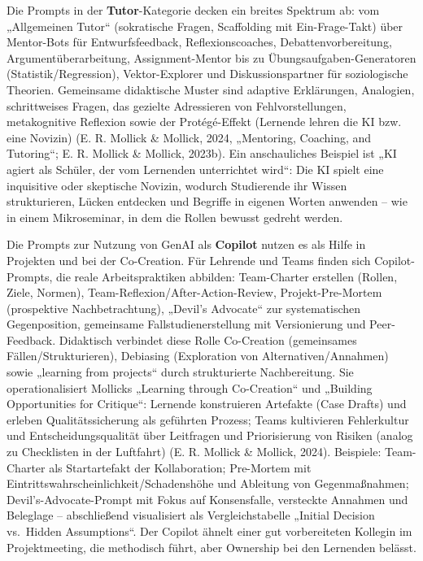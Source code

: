 \documentclass[
  ngerman,
  letterpaper,
  DIV=11]{scrreprt}
\begin{document}
Die Prompts in der \textbf{Tutor}-Kategorie decken ein breites Spektrum
ab: vom „Allgemeinen Tutor`` (sokratische Fragen, Scaffolding mit
Ein-Frage-Takt) über Mentor-Bots für Entwurfsfeedback,
Reflexionscoaches, Debattenvorbereitung, Argumentüberarbeitung,
Assignment-Mentor bis zu Übungsaufgaben-Generatoren
(Statistik/Regression), Vektor-Explorer und Diskussionspartner für
soziologische Theorien. Gemeinsame didaktische Muster sind adaptive
Erklärungen, Analogien, schrittweises Fragen, das gezielte Adressieren
von Fehlvorstellungen, metakognitive Reflexion sowie der Protégé-Effekt
(Lernende lehren die KI bzw. eine Novizin) (E. R. Mollick \& Mollick,
2024, „Mentoring, Coaching, and Tutoring``; E. R. Mollick \& Mollick,
2023b). Ein anschauliches Beispiel ist „KI agiert als Schüler, der vom
Lernenden unterrichtet wird``: Die KI spielt eine inquisitive oder
skeptische Novizin, wodurch Studierende ihr Wissen strukturieren, Lücken
entdecken und Begriffe in eigenen Worten anwenden -- wie in einem
Mikroseminar, in dem die Rollen bewusst gedreht werden.

Die Prompts zur Nutzung von GenAI als \textbf{Copilot} nutzen es als
Hilfe in Projekten und bei der Co-Creation. Für Lehrende und Teams
finden sich Copilot-Prompts, die reale Arbeitspraktiken abbilden:
Team-Charter erstellen (Rollen, Ziele, Normen),
Team-Reflexion/After-Action-Review, Projekt-Pre-Mortem (prospektive
Nachbetrachtung), „Devil's Advocate`` zur systematischen Gegenposition,
gemeinsame Fallstudienerstellung mit Versionierung und Peer-Feedback.
Didaktisch verbindet diese Rolle Co-Creation (gemeinsames
Fällen/Strukturieren), Debiasing (Exploration von Alternativen/Annahmen)
sowie „learning from projects`` durch strukturierte Nachbereitung. Sie
operationalisiert Mollicks „Learning through Co-Creation`` und „Building
Opportunities for Critique``: Lernende konstruieren Artefakte (Case
Drafts) und erleben Qualitätssicherung als geführten Prozess; Teams
kultivieren Fehlerkultur und Entscheidungsqualität über Leitfragen und
Priorisierung von Risiken (analog zu Checklisten in der Luftfahrt) (E.
R. Mollick \& Mollick, 2024). Beispiele: Team-Charter als Startartefakt
der Kollaboration; Pre-Mortem mit
Eintrittswahrscheinlichkeit/Schadenshöhe und Ableitung von
Gegenmaßnahmen; Devil's-Advocate-Prompt mit Fokus auf Konsensfalle,
versteckte Annahmen und Beleglage -- abschließend visualisiert als
Vergleichstabelle „Initial Decision vs.~Hidden Assumptions``. Der
Copilot ähnelt einer gut vorbereiteten Kollegin im Projektmeeting, die
methodisch führt, aber Ownership bei den Lernenden belässt.
\end{document}
